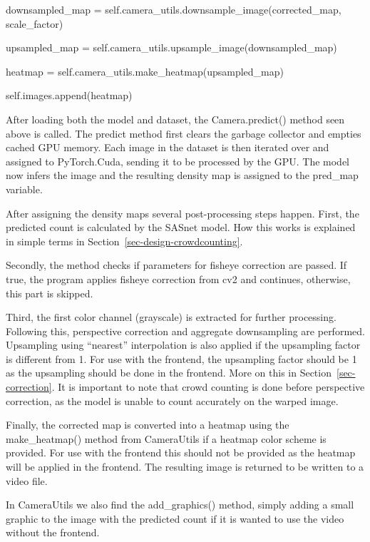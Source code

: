 \documentclass[
]{article}
\newenvironment{Shaded}{\begin{snugshade}}{\end{snugshade}}
\newcommand{\NormalTok}[1]{\textcolor[rgb]{0.00,0.23,0.31}{#1}}
\newcommand{\OperatorTok}[1]{\textcolor[rgb]{0.37,0.37,0.37}{#1}}
\newcommand{\VariableTok}[1]{\textcolor[rgb]{0.07,0.07,0.07}{#1}}
\begin{document}
\begin{Shaded}
\begin{Highlighting}[]
\NormalTok{    downsampled\_map }\OperatorTok{=} \VariableTok{self}\NormalTok{.camera\_utils.downsample\_image(corrected\_map, scale\_factor)}

\NormalTok{    upsampled\_map }\OperatorTok{=} \VariableTok{self}\NormalTok{.camera\_utils.upsample\_image(downsampled\_map)}

\NormalTok{    heatmap }\OperatorTok{=} \VariableTok{self}\NormalTok{.camera\_utils.make\_heatmap(upsampled\_map)}

    \VariableTok{self}\NormalTok{.images.append(heatmap)}
\end{Highlighting}
\end{Shaded}

After loading both the model and dataset, the Camera.predict() method
seen above is called. The predict method first clears the garbage
collector and empties cached GPU memory. Each image in the dataset is
then iterated over and assigned to PyTorch.Cuda, sending it to be
processed by the GPU. The model now infers the image and the resulting
density map is assigned to the pred\_map variable.

After assigning the density maps several post-processing steps happen.
First, the predicted count is calculated by the SASnet model. How this
works is explained in simple terms in
Section~\ref{sec-design-crowdcounting}.

Secondly, the method checks if parameters for fisheye correction are
passed. If true, the program applies fisheye correction from cv2 and
continues, otherwise, this part is skipped.

Third, the first color channel (grayscale) is extracted for further
processing. Following this, perspective correction and aggregate
downsampling are performed. Upsampling using ``nearest'' interpolation
is also applied if the upsampling factor is different from 1. For use
with the frontend, the upsampling factor should be 1 as the upsampling
should be done in the frontend. More on this in
Section~\ref{sec-correction}. It is important to note that crowd
counting is done before perspective correction, as the model is unable
to count accurately on the warped image.

Finally, the corrected map is converted into a heatmap using the
make\_heatmap() method from CameraUtils if a heatmap color scheme is
provided. For use with the frontend this should not be provided as the
heatmap will be applied in the frontend. The resulting image is returned
to be written to a video file.

In CameraUtils we also find the add\_graphics() method, simply adding a
small graphic to the image with the predicted count if it is wanted to
use the video without the frontend.
\end{document}
